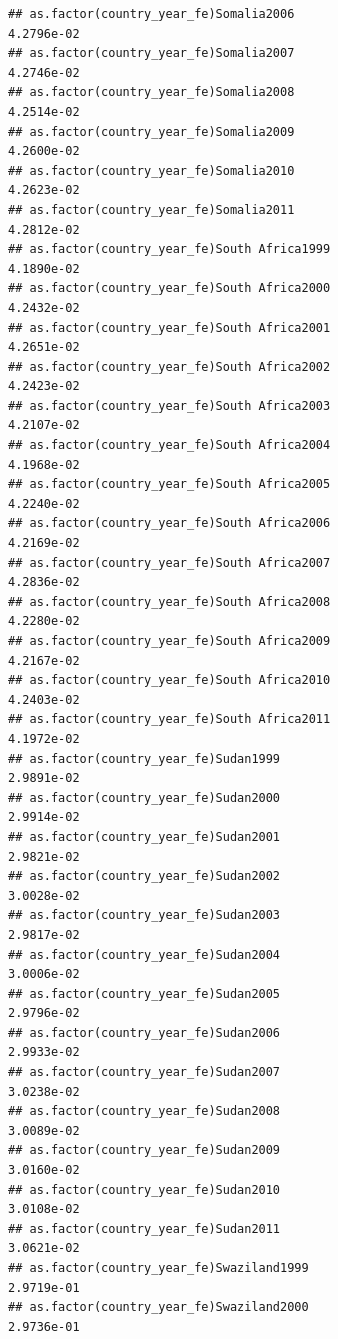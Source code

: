 \documentclass[
  a4paper,
]{article}
\begin{document}
\begin{verbatim}
## as.factor(country_year_fe)Somalia2006                           4.2796e-02
## as.factor(country_year_fe)Somalia2007                           4.2746e-02
## as.factor(country_year_fe)Somalia2008                           4.2514e-02
## as.factor(country_year_fe)Somalia2009                           4.2600e-02
## as.factor(country_year_fe)Somalia2010                           4.2623e-02
## as.factor(country_year_fe)Somalia2011                           4.2812e-02
## as.factor(country_year_fe)South Africa1999                      4.1890e-02
## as.factor(country_year_fe)South Africa2000                      4.2432e-02
## as.factor(country_year_fe)South Africa2001                      4.2651e-02
## as.factor(country_year_fe)South Africa2002                      4.2423e-02
## as.factor(country_year_fe)South Africa2003                      4.2107e-02
## as.factor(country_year_fe)South Africa2004                      4.1968e-02
## as.factor(country_year_fe)South Africa2005                      4.2240e-02
## as.factor(country_year_fe)South Africa2006                      4.2169e-02
## as.factor(country_year_fe)South Africa2007                      4.2836e-02
## as.factor(country_year_fe)South Africa2008                      4.2280e-02
## as.factor(country_year_fe)South Africa2009                      4.2167e-02
## as.factor(country_year_fe)South Africa2010                      4.2403e-02
## as.factor(country_year_fe)South Africa2011                      4.1972e-02
## as.factor(country_year_fe)Sudan1999                             2.9891e-02
## as.factor(country_year_fe)Sudan2000                             2.9914e-02
## as.factor(country_year_fe)Sudan2001                             2.9821e-02
## as.factor(country_year_fe)Sudan2002                             3.0028e-02
## as.factor(country_year_fe)Sudan2003                             2.9817e-02
## as.factor(country_year_fe)Sudan2004                             3.0006e-02
## as.factor(country_year_fe)Sudan2005                             2.9796e-02
## as.factor(country_year_fe)Sudan2006                             2.9933e-02
## as.factor(country_year_fe)Sudan2007                             3.0238e-02
## as.factor(country_year_fe)Sudan2008                             3.0089e-02
## as.factor(country_year_fe)Sudan2009                             3.0160e-02
## as.factor(country_year_fe)Sudan2010                             3.0108e-02
## as.factor(country_year_fe)Sudan2011                             3.0621e-02
## as.factor(country_year_fe)Swaziland1999                         2.9719e-01
## as.factor(country_year_fe)Swaziland2000                         2.9736e-01

\end{verbatim}
\end{document}
